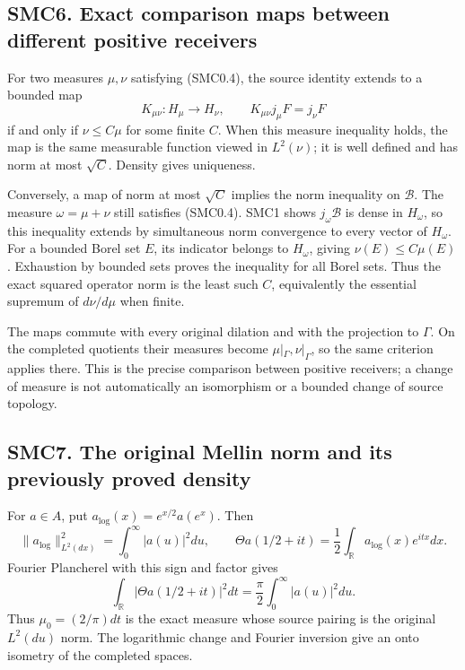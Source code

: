 \subsection{SMC6. Exact comparison maps between different positive
receivers}\label{smc6.-exact-comparison-maps-between-different-positive-receivers}

For two measures \(\mu,\nu\) satisfying (SMC0.4), the source identity
extends to a bounded map \[
K_{\mu\nu}:H_\mu\longrightarrow H_\nu,
\qquad K_{\mu\nu}j_\mu F=j_\nu F
\tag{SMC6.1}
\] if and only if \(\nu\le C\mu\) for some finite \(C\). When this
measure inequality holds, the map is the same measurable function viewed
in \(L^2(\nu)\); it is well defined and has norm at most \(\sqrt C\).
Density gives uniqueness.

Conversely, a map of norm at most \(\sqrt C\) implies the norm
inequality on \(\mathcal B\). The measure \(\omega=\mu+\nu\) still
satisfies (SMC0.4). SMC1 shows \(j_\omega\mathcal B\) is dense in
\(H_\omega\), so this inequality extends by simultaneous norm
convergence to every vector of \(H_\omega\). For a bounded Borel set
\(E\), its indicator belongs to \(H_\omega\), giving
\(\nu(E)\le C\mu(E)\). Exhaustion by bounded sets proves the inequality
for all Borel sets. Thus the exact squared operator norm is the least
such \(C\), equivalently the essential supremum of \(d\nu/d\mu\) when
finite.

The maps commute with every original dilation and with the projection to
\(\Gamma\). On the completed quotients their measures become
\(\mu|_\Gamma,\nu|_\Gamma\), so the same criterion applies there. This
is the precise comparison between positive receivers; a change of
measure is not automatically an isomorphism or a bounded change of
source topology.

\subsection{SMC7. The original Mellin norm and its previously proved
density}\label{smc7.-the-original-mellin-norm-and-its-previously-proved-density}

For \(a\in A\), put \(a_{\log}(x)=e^{x/2}a(e^x)\). Then \[
\|a_{\log}\|_{L^2(dx)}^2=\int_0^\infty|a(u)|^2du,
\qquad
\Theta a(1/2+it)=\frac12\int_{\mathbb R}a_{\log}(x)e^{itx}dx.
\tag{SMC7.1}
\] Fourier Plancherel with this sign and factor gives \[
\int_{\mathbb R}|\Theta a(1/2+it)|^2dt
=\frac\pi2\int_0^\infty|a(u)|^2du.
\tag{SMC7.2}
\] Thus \(\mu_0=(2/\pi)dt\) is the exact measure whose source pairing is
the original \(L^2(du)\) norm. The logarithmic change and Fourier
inversion give an onto isometry of the completed spaces.

